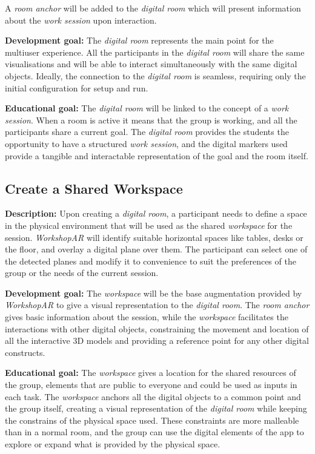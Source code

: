 A \emph{room anchor} will be added to the \emph{digital room} which will present information about the \emph{work session} upon interaction.

\noindent
\textbf{Development goal:} The \emph{digital room} represents the main point for the multiuser experience. All the participants in the \emph{digital room} will share the
same visualisations and will be able to interact simultaneously with the same digital objects. Ideally, the connection to the \emph{digital room} is seamless, requiring
only the initial configuration for setup and run.

\noindent
\textbf{Educational goal:} The \emph{digital room} will be linked to the concept of a \emph{work session}. When a room is active it means that the group is working, and all
the participants share a current goal. The \emph{digital room} provides the students the opportunity to have a structured \emph{work session}, and the digital markers
used provide a tangible and interactable representation of the goal and the room itself.

\subsection{Create a Shared Workspace \label{sec:4-2-2}}

\textbf{Description:} Upon creating a \emph{digital room}, a participant needs to define a space in the physical environment that will be used as the shared \emph{workspace}
for the session. \emph{WorkshopAR} will identify suitable horizontal spaces like tables, desks or the floor, and overlay a digital plane over them. The participant can
select one of the detected planes and modify it to convenience to suit the preferences of the group or the needs of the current session.

\noindent
\textbf{Development goal:} The \emph{workspace} will be the base augmentation provided by \emph{WorkshopAR} to give a visual representation to the \emph{digital room}. The
\emph{room anchor} gives basic information about the session, while the \emph{workspace} facilitates the interactions with other digital objects, constraining the movement
and location of all the interactive 3D models and providing a reference point for any other digital constructs.

\noindent
\textbf{Educational goal:} The \emph{workspace} gives a location for the shared resources of the group, elements that are public to everyone and could be used as inputs in
each task. The \emph{workspace} anchors all the digital objects to a common point and the group itself, creating a visual representation of the \emph{digital room} while
keeping the constrains of the physical space used. These constraints are more malleable than in a normal room, and the group can use the digital elements of the app to
explore or expand what is provided by the physical space.

